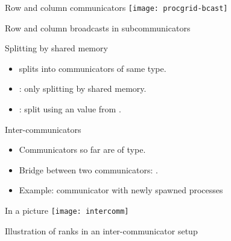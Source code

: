 \begin{numberedframe}{Row and column communicators}
  \texttt{[image: procgrid-bcast]}

  Row and column broadcasts in subcommunicators
\end{numberedframe}

\begin{exerciseframe}[procgrid]
  \footnotesize
  
\end{exerciseframe}

\begin{exerciseframe}
  
\end{exerciseframe}

\begin{numberedframe}{Splitting by shared memory}
  \begin{itemize}
  \item
     splits into communicators of same type.
  \item {}: only  splitting by
    shared memory.
  \item {}: 
    split using an  value from .
  \end{itemize}

\end{numberedframe}

\begin{numberedframe}{Inter-communicators}
\label{sl:comm-inter}
  \begin{itemize}
  \item Communicators so far are of  type.
  \item Bridge between two communicators: .
  \item Example: communicator with newly spawned processes
  \end{itemize}  
\end{numberedframe}

\begin{numberedframe}{In a picture}
  \label{sl:intercomm-picture}
  \texttt{[image: intercomm]}

  Illustration of ranks in an inter-communicator setup
  \tiny{}
\end{numberedframe}

